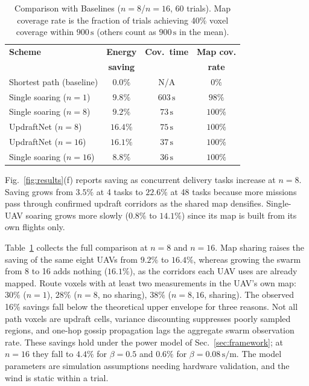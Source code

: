 \documentclass[conference]{IEEEtran}
\newcommand{\rd}[1]{#1}   %
\newcommand{\rdisp}{}     %
\begin{document}
\begin{table}[!t]
\renewcommand{\arraystretch}{1.0}
\caption{Comparison with Baselines ($n=8$/$n=16$, 60 trials).
Map coverage rate is the fraction of trials achieving 40\% voxel coverage
within $900\,\text{s}$\rd{ (others count as $900\,\text{s}$ in the mean)}.}
\label{tab:comparison}
\centering
\begin{tabular}{lccc}
\toprule
\textbf{Scheme} & \textbf{Energy} & \textbf{Cov.\ time} & \textbf{Map cov.} \\
                & \textbf{saving} &                     & \textbf{rate}     \\
\midrule
Shortest path (baseline)        & $0.0\%$           & N/A             & $0\%$   \\
Single soaring ($n=1$)          & \rd{$9.8\%$}           & \rd{$603\,\text{s}$} & \rd{$98\%$}  \\
\rdisp Single soaring ($n=8$)     & \rd{$9.2\%$}           & \rd{$73\,\text{s}$}  & \rd{$100\%$} \\
UpdraftNet ($n=8$)              & \rd{$16.4\%$}     & \rd{$75\,\text{s}$}  & $100\%$ \\
UpdraftNet ($n=16$)             & \rd{$\mathbf{16.1\%}$} & \rd{$37\,\text{s}$}  & $100\%$ \\
\rdisp Single soaring ($n=16$)    & \rd{$8.8\%$}           & \rd{$36\,\text{s}$}  & \rd{$100\%$} \\
\bottomrule
\end{tabular}
\end{table}

Fig.~\ref{fig:results}(f) reports saving as concurrent delivery tasks increase
at $n=8$. Saving grows from \rd{$3.5\%$ at 4 tasks to $22.6\%$ at 48 tasks} because more missions pass through confirmed
updraft corridors as the shared map densifies. Single-UAV
soaring \rd{grows more slowly ($0.8\%$ to $14.1\%$)} since its \rd{map is built from its own flights only}.

Table~\ref{tab:comparison} collects the full comparison at $n=8$ and
$n=16$. \rd{Map sharing raises the saving of the same eight UAVs from $9.2\%$ to $16.4\%$, whereas growing the swarm from 8 to 16 adds nothing ($16.1\%$), as the corridors each UAV uses are already mapped. Route voxels with at least two measurements in the UAV's own map: $30\%$ ($n=1$), $28\%$ ($n=8$, no sharing), $38\%$ ($n=8,16$, sharing).}
The observed \rd{16\%} savings fall below the theoretical upper
envelope for three reasons. Not all path voxels are updraft
cells, variance discounting suppresses poorly sampled regions,
and one-hop gossip propagation lags the aggregate swarm
observation rate.
\rd{These savings hold under the power model of Sec.~\ref{sec:framework}; at $n=16$ they fall to $4.4\%$ for $\beta=0.5$ and $0.6\%$ for $\beta=0.08\,\text{s/m}$. The model parameters are simulation assumptions needing hardware validation, and the wind is static within a trial.}
\end{document}
